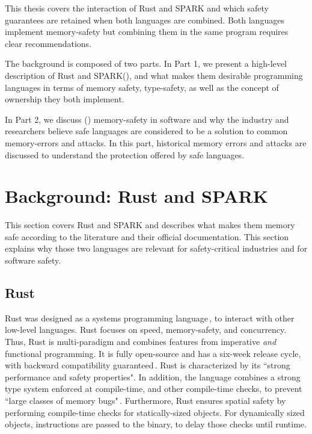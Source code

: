 \documentclass[nomenclature, english, bibtex]{kththesis}
\begin{document}
This thesis covers the interaction of Rust and SPARK and which safety guarantees are retained when both languages are combined. Both languages implement \gls{memory-safety} but combining them in the same program requires clear recommendations. 

The background is composed of two parts. 
In Part 1, we present a 
high-level description of Rust and SPARK(), and what makes them desirable programming languages in terms of memory safety, \gls{type-safety}, as well as the concept of \gls{ownership} they both implement.

In Part 2, we discuss () \gls{memory-safety} in software and why the industry and researchers believe safe languages are considered to be a solution to common \gls{memory-error}s and attacks. In this part, historical memory errors and attacks are discussed to understand the protection offered by safe languages. 

\section{Background: Rust and SPARK}
\label{sec:rust_and_spark}

This section covers Rust and SPARK and describes what makes them memory safe according to the literature and their official documentation. This section explains why those two languages are relevant for \gls{safety-critical} industries and for software safety.


\subsection{Rust}

Rust was designed as a systems programming language\,\cite{mergendahl_cross-language_2022}, to interact with other low-level languages. Rust focuses on speed, \gls{memory-safety}, and concurrency. Thus, Rust is multi-paradigm and combines features from imperative \textit{and} functional programming. It is fully open-source and has a six-week release cycle, with backward compatibility guaranteed\,\cite{poveda_ruiz_bounded_2019,noauthor_rust_nodate}. Rust is characterized by its ``strong performance and safety properties". In addition, the language combines a strong type system enforced at compile-time, and other compile-time checks, to prevent ``large classes of memory bugs"\,\cite{mergendahl_cross-language_2022}. Furthermore, Rust ensures spatial safety by performing compile-time checks for statically-sized objects. For dynamically sized objects, instructions are passed to the binary, to delay those checks until runtime.
\end{document}
